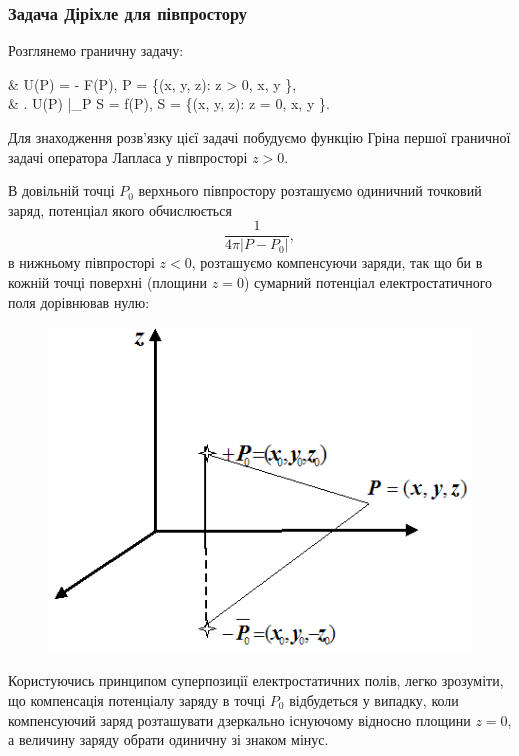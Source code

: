 \subsubsection{Задача Діріхле для півпростору}

Розглянемо граничну задачу:
\begin{system}
	& \Delta U(P) = - F(P), \quad P \in \Omega = \{(x, y, z): z > 0, x, y \in \RR\}, \\
	& \left. U(P) \right|_{P \in S} = f(P), \quad S = \{(x, y, z): z = 0, x, y \in \RR\}.
\end{system}

Для знаходження розв'язку цієї задачі побудуємо функцію Гріна першої граничної задачі оператора Лапласа у півпросторі $z > 0$. \medskip

В довільній точці $P_0$ верхнього півпростору розташуємо одиничний точковий заряд, потенціал якого обчислюється
\begin{equation}
	\frac{1}{4 \pi |P - P_0|},
\end{equation}
в нижньому півпросторі $z < 0$, розташуємо компенсуючи заряди, так що би в кожній точці поверхні (площини $z = 0$) сумарний потенціал електростатичного поля дорівнював нулю:
\begin{figure}[H]
	\centering
	\includegraphics[]{img/20-1.png}
\end{figure}

Користуючись принципом суперпозиції електростатичних полів, легко зрозуміти, що компенсація потенціалу заряду в точці $P_0$ відбудеться у випадку, коли компенсуючий заряд розташувати дзеркально існуючому відносно площини $z = 0$, а величину заряду обрати одиничну зі знаком мінус. \medskip


